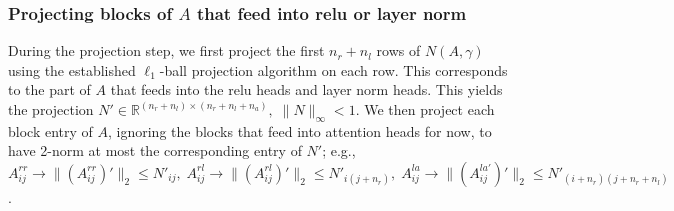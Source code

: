 \documentclass{article}
\begin{document}
\subsubsection{Projecting blocks of \texorpdfstring{$A$}{} that feed into relu or layer norm}
During the projection step, we first project the first $n_r+n_l$ rows of $N(A, \gamma)$ using the
established $\ell_1$-ball projection algorithm on each row. This corresponds to the part of 
$A$ that feeds into the relu heads and layer norm heads. 
This yields the projection $N' \in \mathbb R^{(n_r + n_l)\times (n_r+ n_l+n_a)},\; \|N\|_\infty < 1$.
We then project each block entry of $A$, ignoring the blocks that feed into attention heads for now,
to have 2-norm at most the corresponding entry of $N'$;
e.g., $A^{rr}_{ij} \to \|(A^{rr}_{ij})'\|_2 \leq N'_{ij},\; A^{rl}_{ij} \to \|(A^{rl}_{ij})'\|_2 \leq N'_{i(j+n_r)},
\; A^{la}_{ij} \to \|(A^{la'}_{ij})'\|_2 \leq N'_{(i+n_r)(j+n_r+n_l)}$.
\end{document}
